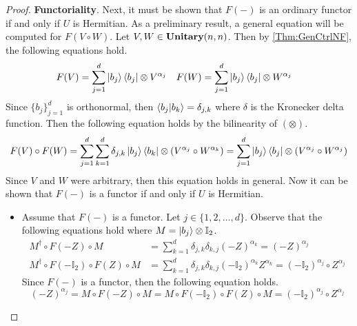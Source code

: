 \begin{proof}
    \noindent
    \textbf{Functoriality}.
    Next, it must be shown that $F( - )$ is an ordinary functor if and only if $U$ is Hermitian.
    As a preliminary result, a general equation will be computed for $F( V \circ W)$.
    Let $V, W \in \mathbf{Unitary}( n, n )$.
    Then by \cref{Thm:GenCtrlNF}, the following equations hold.
    \begin{align*}
        F( V ) &= \sum_{j=1}^{d} \ket{b_j} \bra{b_j} \otimes V^{\alpha_j}
        &
        F( W ) &= \sum_{j=1}^{d} \ket{b_j} \bra{b_j} \otimes W^{\alpha_j}
    \end{align*}
    Since $\{ b_j \}_{j=1}^d$ is orthonormal, then $\braket{b_j|b_k} = \delta_{j,k}$ where $\delta$ is the Kronecker delta function.
    Then the following equation holds by the bilinearity of $( \otimes )$.
    \begin{equation*}
        F( V ) \circ F( W )
        =
        \sum_{j=1}^{d} \sum_{k=1}^{d} \delta_{j,k} \ket{b_j} \bra{b_k} \otimes ( V^{\alpha_j} \circ W^{\alpha_k} )
        =
        \sum_{j=1}^{d} \ket{b_j} \bra{b_j} \otimes ( V^{\alpha_j} \circ W^{\alpha_j} )
    \end{equation*}
    Since $V$ and $W$ were arbitrary, then this equation holds in general.
    Now it can be shown that $F( - )$ is a functor if and only if $U$ is Hermitian.
    \begin{itemize}
    \item Assume that $F( - )$ is a functor.
          Let $j \in \{ 1, 2, \ldots, d \}$.
          Observe that the following equations hold where $M = \ket{b_j} \otimes \mathbb{I}_2$.
          \begin{align*}
              M^\dagger \circ F( -Z ) \circ M
              &=
              \sum_{k=1}^{d} \delta_{j,k} \delta_{k,j} ( -Z )^{\alpha_k}
              =
              ( -Z )^{\alpha_j}
              \\
              M^\dagger \circ F( -\mathbb{I}_2 ) \circ F( Z ) \circ M
              &=
              \sum_{k=1}^{d} \delta_{j,k} \delta_{k,j} ( -\mathbb{I}_2 )^{\alpha_k} Z^{\alpha_k}
              =
              ( -\mathbb{I}_2 )^{\alpha_j} \circ Z^{\alpha_j}
          \end{align*}
          Since $F( - )$ is a functor, then the following equation holds.
          \begin{equation*}
              ( -Z )^{\alpha_j}
              =
              M \circ F( -Z ) \circ M
              =
              M \circ F( -\mathbb{I}_2 ) \circ F( Z ) \circ M
              =
              ( -\mathbb{I}_2 )^{\alpha_j} \circ Z^{\alpha_j}

\end{equation*}
\end{itemize}
\end{proof}
